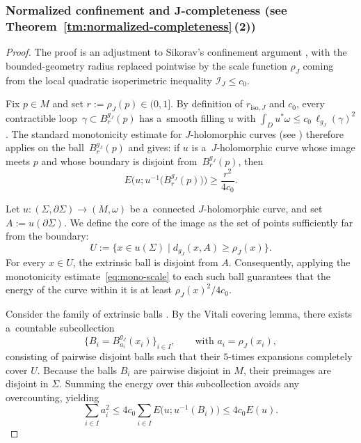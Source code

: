 \documentclass[pdftex]{sigma}
\numberwithin{equation}{section}
\theoremstyle{definition}
\begin{document}
\subsubsection[Normalized confinement and J-completeness (Theorem 1.16 (2))]{Normalized confinement and $\boldsymbol{J}$-completeness (see Theorem~\ref{tm:normalized-completeness}\,(2))}
\begin{proof}

 The proof is an adjustment to Sikorav's confinement argument \cite[Proposition~4.4.1]{Sikorav}, with the bounded-geometry radius replaced pointwise by the scale function $\rho_J$ coming from the local quadratic isoperimetric inequality $\mathcal{I}_J\le c_0$.

 Fix $p\in M$ and set $r:=\rho_J(p)\in(0,1]$.
 By definition of $r_{\mathrm{iso},J}$ and $c_0$, every contractible loop~${\gamma\subset B^{g_J}_{r}(p)}$ has a~smooth filling $u$ with $\int_D u^*\omega\le c_0\,\ell_{g_J}(\gamma)^2$.
 The standard monotonicity estimate for $J$-holomorphic curves (see \cite[Proposition 4.3.1]{Sikorav}) therefore applies on the ball~$B^{g_J}_{r}(p)$ and gives: if $u$ is a~$J$-holomorphic curve whose image meets $p$ and whose boundary is disjoint from~$B^{g_J}_{r}(p)$, then
 \begin{equation}\label{eq:mono-scale}
 E\bigl(u; u^{-1}\bigl(B^{g_J}_{r}(p)\bigr)\bigr) \ge \frac{r^2}{4c_0}.
 \end{equation}

 Let $u\colon(\Sigma,\partial\Sigma)\to(M,\omega)$ be a~connected $J$-holomorphic curve, and set $A:=u(\partial\Sigma)$.
 We define the core of the image as the set of points sufficiently far from the boundary:
 \[ U := \{ x \in u(\Sigma) \mid d_{g_J}(x, A) \ge \rho_J(x) \}. \]
 For every $x \in U$, the extrinsic ball  is disjoint from $A$. Consequently, applying the monotonicity estimate~\eqref{eq:mono-scale} to each such ball guarantees that the energy of the curve within it is at least $\rho_J(x)^2 / 4c_0$.

 Consider the family of extrinsic balls . By the Vitali covering lemma, there exists a~countable subcollection
 \[
 \big\{ B_i = B^{g_J}_{a_i}(x_i) \big\}_{i \in I} , \qquad \text{with $a_i = \rho_J(x_i)$},
 \]
consisting of pairwise disjoint balls such that their $5$-times expansions  completely cover $U$.
 Because the balls $B_i$ are pairwise disjoint in $M$, their preimages are disjoint in $\Sigma$. Summing the energy over this subcollection avoids any overcounting, yielding
 \[%
 \sum_{i \in I} a_i^2 \le 4c_0 \sum_{i \in I} E\bigl(u; u^{-1}(B_i)\bigr) \le 4c_0 E(u).
 \]


\end{proof}
\end{document}
